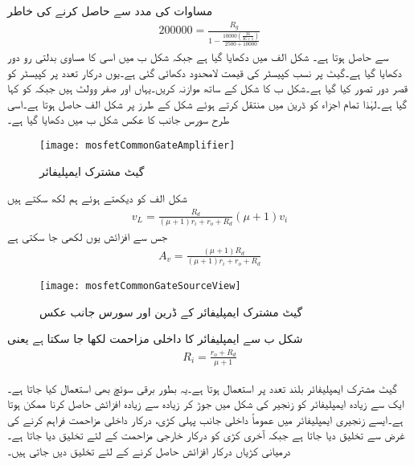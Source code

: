 مساوات  کی مدد سے  حاصل کرنے کی خاطر
\begin{align*}
200000 = \frac{R_g}{1-\frac{10000 \left(\frac{36}{36+1} \right)}{2500+10000}}
\end{align*}
سے  حاصل ہوتا ہے۔
شکل  الف میں  دکھایا گیا ہے جبکہ شکل  ب میں اسی کا مساوی بدلتی رو دور دکھایا گیا ہے۔گیٹ پر نسب کپیسٹر کی قیمت لامحدود دکھائی گئی ہے۔یوں درکار تعدد پر کپیسٹر کو قصر دور تصور کیا گیا ہے۔شکل  ب کا شکل  کے ساتھ موازنہ کریں۔یہاں  اور  صفر وولٹ ہیں جبکہ  کو  کہا گیا ہے۔لہٰذا تمام اجزاء کو ڈرین میں منتقل کرتے ہوئے شکل  کے طرز پر  شکل  الف حاصل ہوتا ہے۔اسی طرح سورس جانب کا عکس شکل  ب میں دکھایا گیا ہے۔ 
\begin{figure}
\centering
\texttt{[image: mosfetCommonGateAmplifier]}
\caption{گیٹ مشترک ایمپلیفائر}
\label{شکل_ماسفیٹ_قابو_مشترک_ایمپلیفائر}
\end{figure}

شکل  الف کو دیکھتے ہوئے ہم لکھ سکتے ہیں
\begin{align*}
v_L=\frac{R_d}{\left(\mu+1 \right) r_i+r_o+R_d} \left(\mu+1 \right) v_i
\end{align*}
جس سے افزائش  یوں لکھی جا سکتی ہے
\begin{align*}
A_v=\frac{\left(\mu+1 \right)R_d}{\left(\mu+1 \right) r_i+r_o+R_d} 
\end{align*}
%
\begin{figure}
\centering
\texttt{[image: mosfetCommonGateSourceView]}
\caption{گیٹ مشترک ایمپلیفائر کے ڈرین اور سورس جانب عکس}
\label{شکل_ماسفیٹ_قابو_مشترک_ایمپلیفائر_عکس}
\end{figure}

شکل  ب سے ایمپلیفائر کا داخلی مزاحمت لکھا جا سکتا ہے یعنی
\begin{align*}
R_i=\frac{r_o+R_d}{\mu+1}
\end{align*}

گیٹ مشترک ایمپلیفائر بلند تعدد پر استعمال ہوتا ہے۔یہ بطور برقی سوئچ بھی استعمال کیا جاتا ہے۔
ایک سے زیادہ ایمپلیفائر کو زنجیر کی شکل میں جوڑ کر زیادہ سے زیادہ افزائش حاصل کرنا ممکن ہوتا ہے۔ایسے زنجیری ایمپلیفائر میں عموماً داخلی جانب پہلی کڑی،  درکار داخلی مزاحمت فراہم کرنے کی غرض سے تخلیق دیا جاتا ہے جبکہ آخری کڑی کو درکار خارجی مزاحمت کے لئے تخلیق دیا جاتا ہے۔درمیانی کڑیاں درکار افزائش حاصل کرنے کے لئے تخلیق دیں جاتی ہیں۔
 
